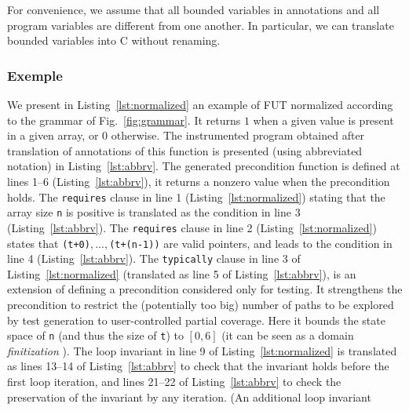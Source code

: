 For convenience, we assume that all bounded variables in annotations and all program variables are different
from one another.
In particular, we can translate bounded variables into C without renaming.


\subsubsection{Exemple}
\label{sec:running-example}



We present in Listing~\ref{lst:normalized} an example of FUT  
normalized according to the grammar of Fig.~\ref{fig:grammar}. It returns $1$
when a given value is present in a given array, or $0$ otherwise. The
instrumented program obtained after translation of annotations of this function
is presented  (using abbreviated notation) in Listing~\ref{lst:abbrv}. The generated  precondition function is
defined at lines 1--6 (Listing~\ref{lst:abbrv}), it returns a nonzero value when the
precondition holds. The \lstinline|requires| clause in line 1
(Listing~\ref{lst:normalized}) stating that the array size \lstinline|n| is
positive  is
translated as the condition in line 3 (Listing~\ref{lst:abbrv}).
The \lstinline|requires| clause in line 2 (Listing~\ref{lst:normalized}) states
that \lstinline|(t+0)|$, ..., $\lstinline|(t+(n-1))| are valid pointers, and leads
to the condition in line 4 (Listing~\ref{lst:abbrv}). The
\lstinline|typically| clause 
in line 3 of Listing~\ref{lst:normalized} (translated
as line 5  of Listing~\ref{lst:abbrv}), 
is an extension of 
\acsl defining a precondition
considered only for testing. It strengthens the precondition to restrict
the (potentially too big) number of paths to be explored by test generation to
user-controlled partial coverage. Here it bounds the state space of
\lstinline|n| (and thus the size of \lstinline|t|) to $[0, 6]$ (it can be seen
as a domain {\em finitization} \cite{Korat}).
The loop invariant in line 9 of Listing~\ref{lst:normalized} 
is translated as lines 13--14 of
Listing~\ref{lst:abbrv} to check that the invariant holds before the first loop
iteration, and lines 21--22 of Listing~\ref{lst:abbrv} to check the preservation of
the invariant by any iteration. (An additional loop invariant 
